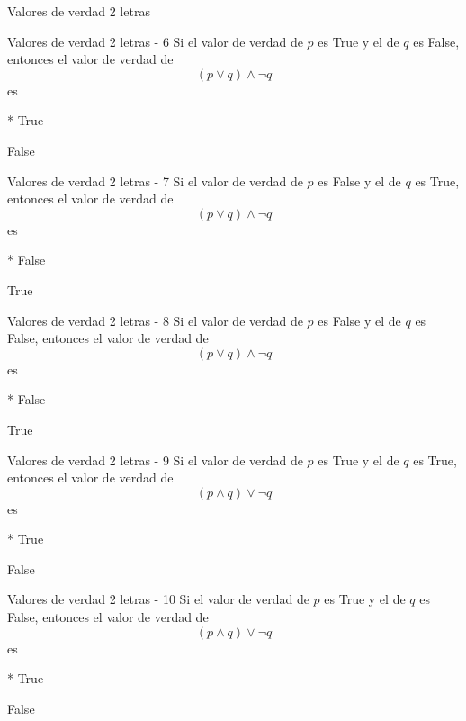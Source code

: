 \documentclass[a4,11pt]{aleph-notas}
\begin{document}
\begin{quiz}{Valores de verdad 2 letras}
\begin{multi}%
    {Valores de verdad 2 letras - 6}
    Si el valor de verdad de $p$ es True y el de $q$ es False, entonces el valor de verdad de 
    \[
        (p \lor q) \land \neg q 
    \]
    es
    \item[]* True
    \item[] False
\end{multi}

\begin{multi}%
    {Valores de verdad 2 letras - 7}
    Si el valor de verdad de $p$ es False y el de $q$ es True, entonces el valor de verdad de 
    \[
        (p \lor q) \land \neg q 
    \]
    es
    \item[]* False
    \item[] True
\end{multi}

\begin{multi}%
    {Valores de verdad 2 letras - 8}
    Si el valor de verdad de $p$ es False y el de $q$ es False, entonces el valor de verdad de 
    \[
        (p \lor q) \land \neg q 
    \]
    es
    \item[]* False
    \item[] True
\end{multi}

\begin{multi}%
    {Valores de verdad 2 letras - 9}
    Si el valor de verdad de $p$ es True y el de $q$ es True, entonces el valor de verdad de 
    \[
        (p \land q) \lor \neg q 
    \]
    es
    \item[]* True
    \item[] False
\end{multi}

\begin{multi}%
    {Valores de verdad 2 letras - 10}
    Si el valor de verdad de $p$ es True y el de $q$ es False, entonces el valor de verdad de 
    \[
        (p \land q) \lor \neg q 
    \]
    es
    \item[]* True
    \item[] False
\end{multi}


\end{quiz}
\end{document}
